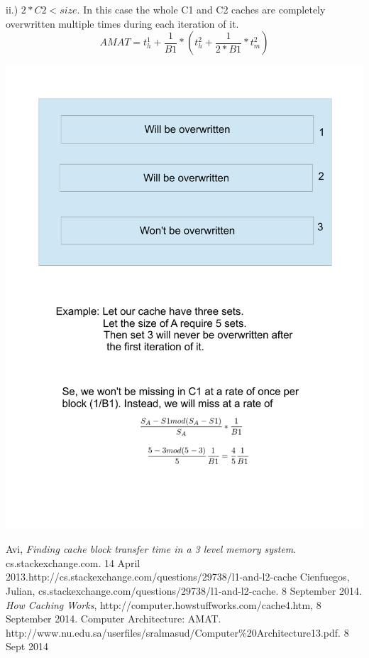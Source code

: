 \documentclass{article} %
\begin{document}
ii.) $2*C2 < size$.
In this case the whole C1 and C2 caches are completely overwritten multiple times during each iteration of it.
\begin{equation}
AMAT = t_h^1 + \frac{1}{B1}*(t_h^2+\frac{1}{2*B1}* t_m^2)
\end{equation}
\newpage
\begin{center}
\includegraphics[scale = 0.6]{L2.pdf}
\end{center}
\begin{thebibliography}{9}
  Avi,
  \emph{Finding cache block transfer time in a 3 level memory system}.
cs.stackexchange.com. 14 April 2013.http://cs.stackexchange.com/questions/29738/l1-and-l2-cache
 Cienfuegos, Julian, cs.stackexchange.com/questions/29738/l1-and-l2-cache. 8 September 2014.
\emph{How Caching Works}, http://computer.howstuffworks.com/cache4.htm, 8 September 2014.
 Computer Architecture: AMAT. http://www.nu.edu.sa/userfiles/sralmasud/Computer\%20Architecture13.pdf. 8 Sept 2014
\end{thebibliography}
\end{document}
